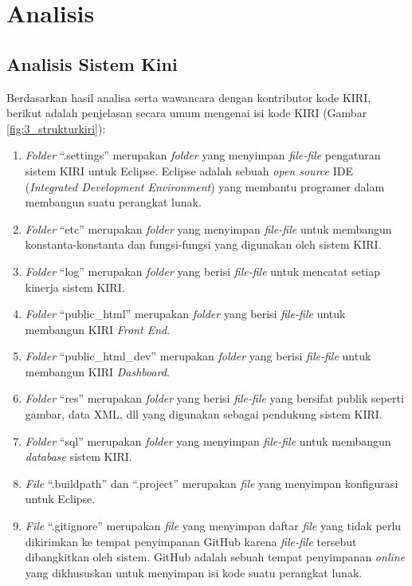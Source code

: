 \chapter{Analisis}
\label{chap:analisis}

\section{Analisis Sistem Kini}
\label{sec:analisissistemkini}
Berdasarkan hasil analisa serta wawancara dengan kontributor kode KIRI, berikut adalah penjelasan secara umum mengenai isi kode KIRI (Gambar \ref{fig:3_strukturkiri}):
\begin{enumerate}
	\item \textit{Folder} ``.settings'' merupakan \textit{folder} yang menyimpan \textit{file-file} pengaturan sistem KIRI untuk Eclipse. Eclipse adalah sebuah \textit{open source} IDE (\textit{Integrated Development Environment}) yang membantu programer dalam membangun suatu perangkat lunak\cite{eclipse}.
	\item \textit{Folder} ``etc'' merupakan \textit{folder} yang menyimpan \textit{file-file} untuk membangun konstanta-konstanta dan fungsi-fungsi yang digunakan oleh sistem KIRI.
	\item \textit{Folder} ``log'' merupakan \textit{folder} yang berisi \textit{file-file} untuk mencatat setiap kinerja sistem KIRI.
	\item \textit{Folder} ``public\_html'' merupakan \textit{folder} yang berisi \textit{file-file} untuk membangun KIRI \textit{Front End}.
	\item \textit{Folder} ``public\_html\_dev'' merupakan \textit{folder} yang berisi \textit{file-file} untuk membangun KIRI \textit{Dashboard}.
	\item \textit{Folder} ``res'' merupakan \textit{folder} yang berisi \textit{file-file} yang bersifat publik seperti gambar, data XML, dll yang digunakan sebagai pendukung sistem KIRI.
	\item \textit{Folder} ``sql'' merupakan \textit{folder} yang menyimpan \textit{file-file} untuk membangun \textit{database} sistem KIRI.
	\item \textit{File} ``.buildpath'' dan ``.project'' merupakan \textit{file} yang menyimpan konfigurasi untuk Eclipse.
	\item \textit{File} ``.gitignore'' merupakan \textit{file} yang menyimpan daftar \textit{file} yang tidak perlu dikirimkan ke tempat penyimpanan GitHub karena \textit{file-file} tersebut dibangkitkan oleh sistem. GitHub adalah sebuah tempat penyimpanan \textit{online} yang dikhususkan untuk menyimpan isi kode suatu perangkat lunak\cite{github}.

\end{enumerate}
